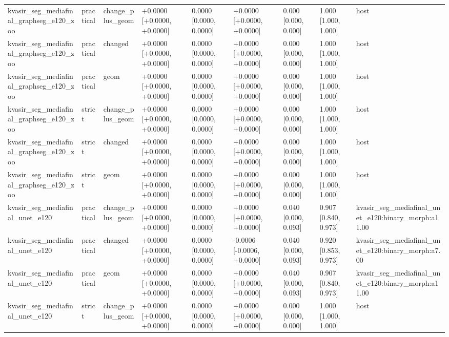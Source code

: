 \begin{table}[t]
\begin{tabular}{lllllllll}
kvasir\_seg\_mediafinal\_graphseg\_e120\_zoo & practical & change\_plus\_geom & +0.0000 [+0.0000, +0.0000] & 0.0000 [0.0000, 0.0000] & +0.0000 [+0.0000, +0.0000] & 0.000 [0.000, 0.000] & 1.000 [1.000, 1.000] & host \\
kvasir\_seg\_mediafinal\_graphseg\_e120\_zoo & practical & changed & +0.0000 [+0.0000, +0.0000] & 0.0000 [0.0000, 0.0000] & +0.0000 [+0.0000, +0.0000] & 0.000 [0.000, 0.000] & 1.000 [1.000, 1.000] & host \\
kvasir\_seg\_mediafinal\_graphseg\_e120\_zoo & practical & geom & +0.0000 [+0.0000, +0.0000] & 0.0000 [0.0000, 0.0000] & +0.0000 [+0.0000, +0.0000] & 0.000 [0.000, 0.000] & 1.000 [1.000, 1.000] & host \\
kvasir\_seg\_mediafinal\_graphseg\_e120\_zoo & strict & change\_plus\_geom & +0.0000 [+0.0000, +0.0000] & 0.0000 [0.0000, 0.0000] & +0.0000 [+0.0000, +0.0000] & 0.000 [0.000, 0.000] & 1.000 [1.000, 1.000] & host \\
kvasir\_seg\_mediafinal\_graphseg\_e120\_zoo & strict & changed & +0.0000 [+0.0000, +0.0000] & 0.0000 [0.0000, 0.0000] & +0.0000 [+0.0000, +0.0000] & 0.000 [0.000, 0.000] & 1.000 [1.000, 1.000] & host \\
kvasir\_seg\_mediafinal\_graphseg\_e120\_zoo & strict & geom & +0.0000 [+0.0000, +0.0000] & 0.0000 [0.0000, 0.0000] & +0.0000 [+0.0000, +0.0000] & 0.000 [0.000, 0.000] & 1.000 [1.000, 1.000] & host \\
kvasir\_seg\_mediafinal\_unet\_e120 & practical & change\_plus\_geom & +0.0000 [+0.0000, +0.0000] & 0.0000 [0.0000, 0.0000] & +0.0000 [+0.0000, +0.0000] & 0.040 [0.000, 0.093] & 0.907 [0.840, 0.973] & kvasir\_seg\_mediafinal\_unet\_e120:binary\_morph:a11.00 \\
kvasir\_seg\_mediafinal\_unet\_e120 & practical & changed & +0.0000 [+0.0000, +0.0000] & 0.0000 [0.0000, 0.0000] & -0.0006 [-0.0006, +0.0000] & 0.040 [0.000, 0.093] & 0.920 [0.853, 0.973] & kvasir\_seg\_mediafinal\_unet\_e120:binary\_morph:a7.00 \\
kvasir\_seg\_mediafinal\_unet\_e120 & practical & geom & +0.0000 [+0.0000, +0.0000] & 0.0000 [0.0000, 0.0000] & +0.0000 [+0.0000, +0.0000] & 0.040 [0.000, 0.093] & 0.907 [0.840, 0.973] & kvasir\_seg\_mediafinal\_unet\_e120:binary\_morph:a11.00 \\
kvasir\_seg\_mediafinal\_unet\_e120 & strict & change\_plus\_geom & +0.0000 [+0.0000, +0.0000] & 0.0000 [0.0000, 0.0000] & +0.0000 [+0.0000, +0.0000] & 0.000 [0.000, 0.000] & 1.000 [1.000, 1.000] & host \\

\end{tabular}
\end{table}

